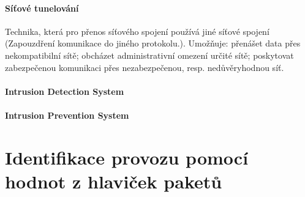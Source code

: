 \paragraph*{Síťové tunelování} Technika, která pro přenos síťového spojení používá jiné síťové spojení (Zapouzdření komunikace do jiného protokolu.). Umožňuje: přenášet data přes nekompatibilní sítě; obcházet administrativní omezení určité sítě; poskytovat zabezpečenou komunikaci přes nezabezpečenou, resp. nedůvěryhodnou síť.

\paragraph*{Intrusion Detection System} 

\paragraph*{Intrusion Prevention System} 


\section{Identifikace provozu pomocí hodnot z hlaviček paketů}

